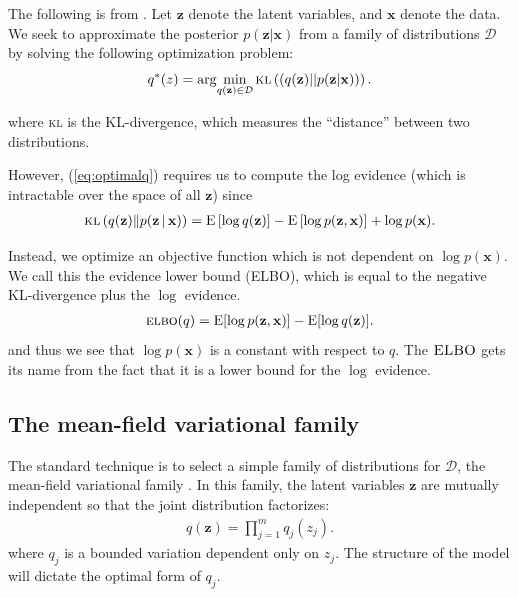 \documentclass[11pt]{article}
\newcommand{\bx}{\ensuremath{\mathbf{x}}}
\newcommand{\bz}{\ensuremath{\mathbf{z}}}
\newcommand{\kl}[1]{\textsc{kl}\left(#1\right)}
\newcommand{\g}{\,\vert\,}
\newcommand{\ELBO}{\textsc{elbo}}
\newcommand{\E}{\mathrm{E}}
\begin{document}
The following is from \cite{Blei2006}. Let $\mathbf{z}$ denote the latent variables, and $\mathbf{x}$ denote the data. We seek to approximate the posterior $p(\mathbf{z}|\mathbf{x})$ from a family of distributions $\mathcal{D}$ by solving the following optimization problem: 
\begin{equation} \label{eq:optimalq}
q^*(z) = \arg\!\min_{q(\mathbf{z}) \in \mathcal{D}} \kl{(q(\mathbf{z}) || p(\mathbf{z}|\mathbf{x}))}.
\end{equation}

where \textsc{kl} is the KL-divergence, which measures the ``distance'' between two distributions. 

However, (\ref{eq:optimalq}) requires us to compute the log evidence (which is intractable over the space of all $\mathbf{z}$) since 
\begin{align}
  \kl{q(\bz) \| p(\bz \g \bx)} =
  \E\left[\log q(\bz)\right] -
  \E\left[\log p(\bz, \bx)\right] +
  \log p(\bx). 
\end{align}

Instead, we optimize an objective function which is not dependent on $\log p(\bx)$. We call this the evidence lower bound (\textsc{ELBO}), which is equal to the negative \textsc{KL}-divergence plus the $\log$ evidence.
\begin{align} \label{eq:ELBO}
  \ELBO(q) =
  \E{[\log p(\bz, \bx)]} -
  \E{[\log q(\bz)]}.
\end{align}
and thus we see that $\log p(\bx)$ is a constant with respect to $q$. The $\textsc{ELBO}$ gets its name from the fact that it is a lower bound for the $\log$ evidence. 

\subsection{The mean-field variational family}
The standard technique is to select a simple family of distributions for $\mathcal{D}$, the mean-field variational family \cite{Blei2006}. In this family, the latent variables $\bz$ are mutually independent so that the joint distribution factorizes:
\begin{align} \label{eq:meanfield}
  q(\bz) = \prod_{j=1}^{m} q_j(z_j).
\end{align}
where $q_j$ is a bounded variation dependent only on $z_j$. The structure of the model will dictate the optimal form of $q_j$. 
\end{document}
